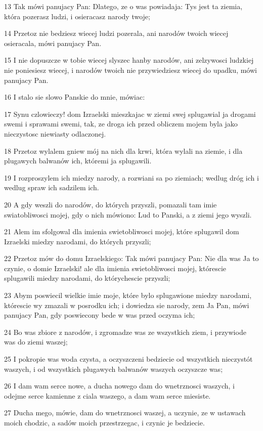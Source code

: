 \par 13 Tak mówi panujacy Pan: Dlatego, ze o was powiadaja: Tys jest ta ziemia, która pozerasz ludzi, i osieracasz narody twoje;
\par 14 Przetoz nie bedziesz wiecej ludzi pozerala, ani narodów twoich wiecej osieracala, mówi panujacy Pan.
\par 15 I nie dopuszcze w tobie wiecej slyszec hanby narodów, ani zelzywosci ludzkiej nie poniesiesz wiecej, i narodów twoich nie przywiedziesz wiecej do upadku, mówi panujacy Pan.
\par 16 I stalo sie slowo Panskie do mnie, mówiac:
\par 17 Synu czlowieczy! dom Izraelski mieszkajac w ziemi swej splugawial ja drogami swemi i sprawami swemi, tak, ze droga ich przed obliczem mojem byla jako nieczystosc niewiasty odlaczonej.
\par 18 Przetoz wylalem gniew mój na nich dla krwi, która wylali na ziemie, i dla plugawych balwanów ich, któremi ja splugawili.
\par 19 I rozproszylem ich miedzy narody, a rozwiani sa po ziemiach; wedlug dróg ich i wedlug spraw ich sadzilem ich.
\par 20 A gdy weszli do narodów, do których przyszli, pomazali tam imie swiatobliwosci mojej, gdy o nich mówiono: Lud to Panski, a z ziemi jego wyszli.
\par 21 Alem im sfolgowal dla imienia swietobliwosci mojej, które splugawil dom Izraelski miedzy narodami, do których przyszli;
\par 22 Przetoz mów do domu Izraelskiego: Tak mówi panujacy Pan: Nie dla was Ja to czynie, o domie Izraelski! ale dla imienia swietobliwosci mojej, którescie splugawili miedzy narodami, do którychescie przyszli;
\par 23 Abym poswiecil wielkie imie moje, które bylo splugawione miedzy narodami, którescie wy zmazali w posrodku ich; i dowiedza sie narody, zem Ja Pan, mówi panujacy Pan, gdy poswiecony bede w was przed oczyma ich;
\par 24 Bo was zbiore z narodów, i zgromadze was ze wszystkich ziem, i przywiode was do ziemi waszej;
\par 25 I pokropie was woda czysta, a oczyszczeni bedziecie od wszystkich nieczystót waszych, i od wszystkich plugawych balwanów waszych oczyszcze was;
\par 26 I dam wam serce nowe, a ducha nowego dam do wnetrznosci waszych, i odejme serce kamienne z ciala waszego, a dam wam serce miesiste.
\par 27 Ducha mego, mówie, dam do wnetrznosci waszej, a uczynie, ze w ustawach moich chodzic, a sadów moich przestrzegac, i czynic je bedziecie.
